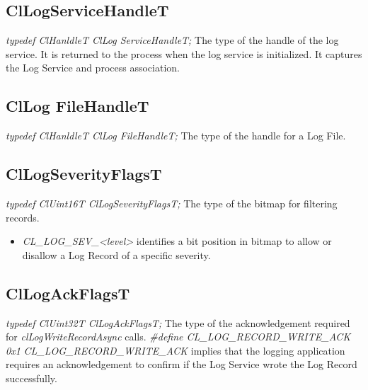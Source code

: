 \begin{flushleft}
\begin{itemize}
\subsection{ClLogServiceHandleT}
\textit{typedef ClHanldleT ClLog ServiceHandleT;}
\newline
\newline
The type of the handle of the log service. It is returned to the process when the log service is initialized.
It captures the Log Service and process association.
	


\subsection{ClLog FileHandleT}
\textit{typedef ClHanldleT ClLog FileHandleT;}
\newline
\newline
The type of the handle for a Log File.





\subsection{ClLogSeverityFlagsT}
\textit{typedef ClUint16T ClLogSeverityFlagsT;}
\newline
\newline
The type of the bitmap for filtering records.
\begin{itemize}
\item
\textit{CL\_\-LOG\_\-SEV\_\-<level>} identifies a bit position in bitmap to allow or disallow a Log Record of a specific severity.
\end{itemize}	


\subsection{ClLogAckFlagsT}
\textit{typedef ClUint32T ClLogAckFlagsT;}
\newline
\newline
The type of the acknowledgement required for \textit{clLogWriteRecordAsync} calls.
\newline 
\newline
\textit{\#define CL\_\-LOG\_\-RECORD\_\-WRITE\_\-ACK    0x1}
\newline 
\newline
\textit{CL\_\-LOG\_\-RECORD\_\-WRITE\_\-ACK} implies that the logging application requires an acknowledgement to confirm if the Log Service 
 wrote the Log Record successfully.








\end{itemize}
\end{flushleft}
